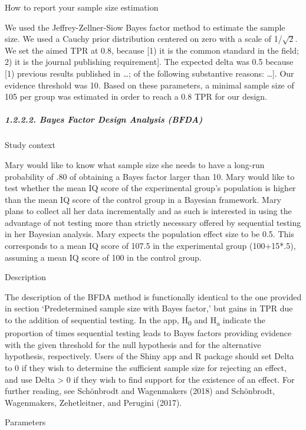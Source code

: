 \documentclass[
  english,
  man,floatsintext]{apa6}
\let\oldsubparagraph\subparagraph
\renewcommand{\subparagraph}[1]{\oldsubparagraph{#1}\mbox{}}
\begin{document}
How to report your sample size estimation

We used the Jeffrey-Zellner-Siow Bayes factor method to estimate the sample size. We used a Cauchy prior distribution centered on zero with a scale of 1/\(\sqrt{2}\). We set the aimed TPR at 0.8, because {[}1) it is the common standard in the field; 2) it is the journal publishing requirement{]}. The expected delta was 0.5 because {[}1) previous results published in \ldots; of the following substantive reasons: \ldots{]}. Our evidence threshold was 10. Based on these parameters, a minimal sample size of 105 per group was estimated in order to reach a 0.8 TPR for our design.

\hypertarget{bayes-factor-design-analysis-bfda}{%
\subparagraph{1.2.2.2. Bayes Factor Design Analysis (BFDA)}\label{bayes-factor-design-analysis-bfda}}

Study context

Mary would like to know what sample size she needs to have a long-run probability of .80 of obtaining a Bayes factor larger than 10. Mary would like to test whether the mean IQ score of the experimental group's population is higher than the mean IQ score of the control group in a Bayesian framework. Mary plans to collect all her data incrementally and as such is interested in using the advantage of not testing more than strictly necessary offered by sequential testing in her Bayesian analysis. Mary expects the population effect size to be 0.5. This corresponds to a mean IQ score of 107.5 in the experimental group (100+15*.5), assuming a mean IQ score of 100 in the control group.

Description

The description of the BFDA method is functionally identical to the one provided in section `Predetermined sample size with Bayes factor,' but gains in TPR due to the addition of sequential testing. In the app, H\textsubscript{0} and H\textsubscript{a} indicate the proportion of times sequential testing leads to Bayes factors providing evidence with the given threshold for the null hypothesis and for the alternative hypothesis, respectively. Users of the Shiny app and R package should set Delta to 0 if they wish to determine the sufficient sample size for rejecting an effect, and use Delta \textgreater{} 0 if they wish to find support for the existence of an effect. For further reading, see Schönbrodt and Wagenmakers (2018) and Schönbrodt, Wagenmakers, Zehetleitner, and Perugini (2017).

Parameters
\end{document}
